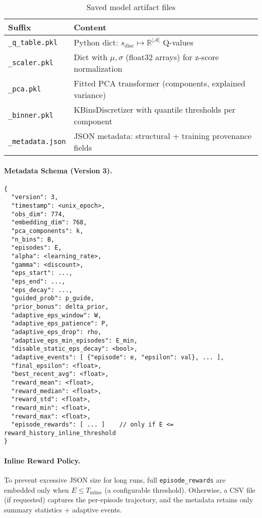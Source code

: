 \begin{table}[htbp]
\centering
\footnotesize
\caption{Saved model artifact files}
\label{tab:model-artifacts}
\begin{tabularx}{\linewidth}{@{}l X@{}}
\toprule
\textbf{Suffix} & \textbf{Content} \\
\midrule
\texttt{\_q\_table.pkl}   & Python dict: $s_{\text{disc}} \mapsto \mathbb{R}^{|\mathcal{A}|}$ Q-values \\
\texttt{\_scaler.pkl}     & Dict with $\mu, \sigma$ (float32 arrays) for z-score normalization \\
\texttt{\_pca.pkl}        & Fitted PCA transformer (components, explained variance) \\
\texttt{\_binner.pkl}     & KBinsDiscretizer with quantile thresholds per component \\
\texttt{\_metadata.json}  & JSON metadata: structural + training provenance fields \\
\bottomrule
\end{tabularx}
\end{table}


\paragraph{Metadata Schema (Version 3).}
{\scriptsize
\begin{verbatim}
{
  "version": 3,
  "timestamp": <unix_epoch>,
  "obs_dim": 774,
  "embedding_dim": 768,
  "pca_components": k,
  "n_bins": B,
  "episodes": E,
  "alpha": <learning_rate>,
  "gamma": <discount>,
  "eps_start": ...,
  "eps_end": ...,
  "eps_decay": ...,
  "guided_prob": p_guide,
  "prior_bonus": delta_prior,
  "adaptive_eps_window": W,
  "adaptive_eps_patience": P,
  "adaptive_eps_drop": rho,
  "adaptive_eps_min_episodes": E_min,
  "disable_static_eps_decay": <bool>,
  "adaptive_events": [ {"episode": e, "epsilon": val}, ... ],
  "final_epsilon": <float>,
  "best_recent_avg": <float>,
  "reward_mean": <float>,
  "reward_median": <float>,
  "reward_std": <float>,
  "reward_min": <float>,
  "reward_max": <float>,
  "episode_rewards": [ ... ]    // only if E <= reward_history_inline_threshold
}
\end{verbatim}
}
\paragraph{Inline Reward Policy.}
To prevent excessive JSON size for long runs, full \texttt{episode\_rewards} are embedded only when $E \le T_{\text{inline}}$ (a configurable threshold). Otherwise, a CSV file (if requested) captures the per-episode trajectory, and the metadata retains only summary statistics + adaptive events.

